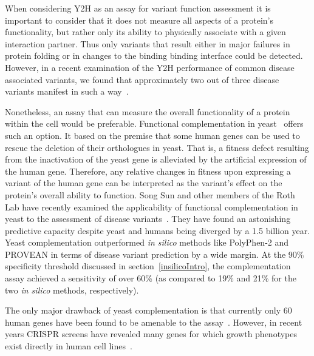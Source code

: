 
When considering Y2H as an assay for variant function assessment it is important to consider that it does not measure all aspects of a protein's functionality, but rather only its ability to physically associate with a given interaction partner. Thus only variants that result either in major failures in protein folding or in changes to the binding binding interface could be detected. However, in a recent examination of the Y2H performance of common disease associated variants, we found that approximately two out of three disease variants manifest in such a way~\cite{sahni_widespread_2015}. 



Nonetheless, an assay that can measure the overall functionality of a protein within the cell would be preferable. Functional complementation in yeast~\cite{lee_complementation_1987,osborn_rescuing_2007} offers such an option. It based on the premise that some human genes can be used to rescue the deletion of their orthologues in yeast. That is, a fitness defect resulting from the inactivation of the yeast gene is alleviated by the artificial expression of the human gene. Therefore, any relative changes in fitness upon expressing a variant of the human gene can be interpreted as the variant's effect on the protein's overall ability to function. Song Sun and other members of the Roth Lab have recently examined the applicability of functional complementation in yeast to the assessment of disease variants~\cite{sun_extended_2016}. They have found an astonishing predictive capacity despite yeast and humans being diverged by a 1.5 billion year. Yeast complementation outperformed \textit{in silico} methods like PolyPhen-2 and PROVEAN in terms of disease variant prediction by a wide margin. At the 90\% specificity threshold discussed in section~\ref{insilicoIntro}, the complementation assay achieved a sensitivity of over 60\% (as compared to 19\% and 21\% for the two \textit{in silico} methods, respectively).

The only major drawback of yeast complementation is that currently only 60 human genes have been found to be amenable to the assay~\cite{sun_extended_2016}. However, in recent years CRISPR screens have revealed many genes for which growth phenotypes exist directly in human cell lines~. 


